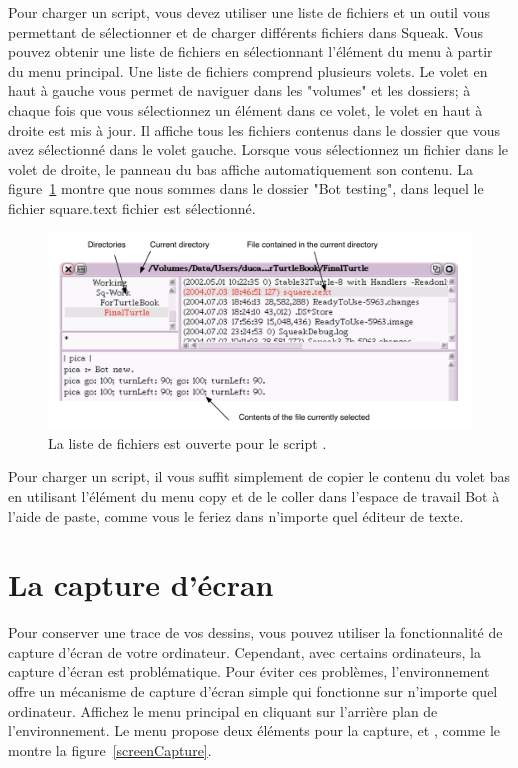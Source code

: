 \documentclass[a4paper,10pt,twoside]{book}
\begin{document}
Pour charger un script, vous devez utiliser une liste de fichiers et un outil vous permettant de s\'electionner et de charger diff\'erents fichiers dans Squeak. Vous pouvez obtenir une liste de fichiers en s\'electionnant l'\'el\'ement du menu  \`a partir du menu principal. Une liste de fichiers comprend plusieurs volets. Le volet en haut \`a gauche vous permet de naviguer dans les "volumes" et les dossiers; \`a chaque fois que vous s\'electionnez un \'el\'ement dans ce volet, le volet en haut \`a droite est mis \`a jour. Il affiche tous les fichiers contenus dans le dossier que vous avez s\'electionn\'e dans le volet gauche. Lorsque vous s\'electionnez un fichier dans le volet de droite, le panneau du bas affiche automatiquement son contenu. La figure~\ref{fig:filelistOpen} montre que nous sommes dans le dossier "Bot testing", dans lequel le fichier \textsf{square.text} fichier est s\'electionn\'e. 


\begin{figure}[h]\begin{center}
\includegraphics[width=12cm]{filelistOpenAnnotated}
\caption{La liste de fichiers est ouverte pour le script  .\label{fig:filelistOpen}}\end{center}
\end{figure}

 

Pour charger un script, il vous suffit simplement de copier le contenu du volet bas en utilisant l'\'el\'ement du menu copy et de le coller dans l'espace de travail Bot \`a l'aide de paste, comme vous le feriez dans n'importe quel \'editeur de texte. 

\section{La capture d'\'ecran }

Pour conserver une trace de vos dessins, vous pouvez utiliser la fonctionnalit\'e de capture d'\'ecran de votre ordinateur. Cependant, avec certains ordinateurs, la capture d'\'ecran est probl\'ematique. Pour \'eviter ces probl\`emes, l'environnement offre un m\'ecanisme de capture d'\'ecran simple qui fonctionne sur n'importe quel ordinateur. Affichez le menu principal en cliquant sur l'arri\`ere plan de l'environnement. Le menu propose deux \'el\'ements pour la capture,  et , comme le montre la figure~\ref{screenCapture}. 
\end{document}
